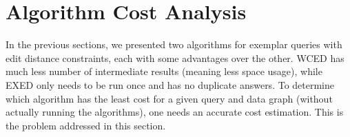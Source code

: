 \documentclass{sigmod}
\begin{document}

\section{Algorithm Cost Analysis}
In the previous sections, we presented two algorithms for exemplar queries with edit distance constraints, each with some advantages over the other. WCED has much less number of intermediate results (meaning less space usage), while EXED only needs to be run once and has no duplicate answers. To determine which algorithm has the least cost for a given query and data graph (without actually running the algorithms), one needs an accurate cost estimation. This is the problem addressed in this section. 
\end{document}
